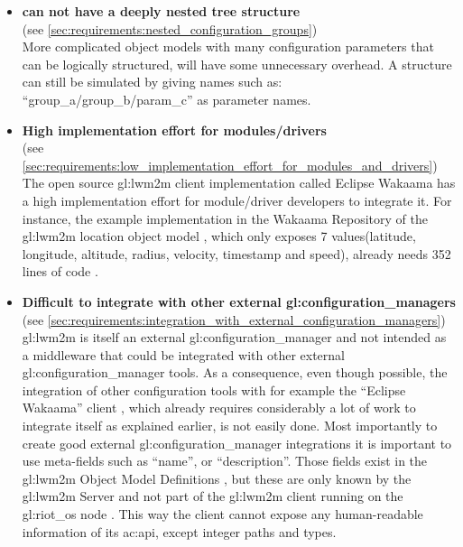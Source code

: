 \begin{itemize}
      \item \textbf{ can not have a deeply nested tree structure}\\
            (see \autoref{sec:requirements:nested_configuration_groups})\\
            More complicated object models with many configuration parameters that can be logically structured, will have some unnecessary overhead.
            A structure can still be simulated by giving names such as:
            ``group\_a/group\_b/param\_c'' as parameter names.

      \item \textbf{High implementation effort for modules/drivers}\\
            (see \autoref{sec:requirements:low_implementation_effort_for_modules_and_drivers})\\
            The open source \gls{gl:lwm2m} client implementation called Eclipse Wakaama \cite{eclipse_wakaama} has a high implementation effort for module/driver developers to integrate it.
            For instance, the example implementation in the Wakaama Repository of the \gls{gl:lwm2m} location object model \cite[p. 125]{oma-lwm2m-core-12}, which only exposes 7 values(latitude, longitude, altitude, radius, velocity, timestamp and speed), already needs 352 lines of code \cite[p. 125]{oma-lwm2m-core-12}.

      \item \textbf{Difficult to integrate with other external \glspl{gl:configuration_manager}}\\
            (see \autoref{sec:requirements:integration_with_external_configuration_managers})\\
            \gls{gl:lwm2m} is itself an external \gls{gl:configuration_manager} and not intended as a middleware that could be integrated with other external \gls{gl:configuration_manager} tools.
            As a consequence, even though possible, the integration of other configuration tools with for example the ``Eclipse Wakaama'' client \cite{eclipse_wakaama}, which already requires considerably a lot of work to integrate itself as explained earlier, is not easily done.
            Most importantly to create good external \gls{gl:configuration_manager} integrations it is important to use meta-fields such as ``name'', or ``description''.
            Those fields exist in the \gls{gl:lwm2m} Object Model Definitions \cite[p. 68]{oma-lwm2m-core-12}, but these are only known by the \gls{gl:lwm2m} Server and not part of the \gls{gl:lwm2m} client running on the \gls{gl:riot_os} node \cite{oma-lwm2m-core-12}.
            This way the client cannot expose any human-readable information of its \gls{ac:api}, except integer paths and types.
\end{itemize}

